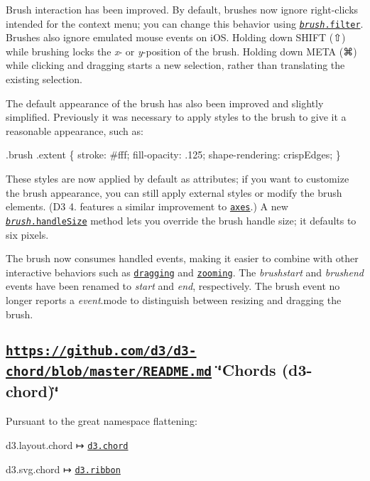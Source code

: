 Brush interaction has been improved. By default, brushes now ignore right-\/clicks intended for the context menu; you can change this behavior using \href{https://github.com/d3/d3-brush/blob/master/README.md#brush_filter}{\tt {\itshape brush}.filter}. Brushes also ignore emulated mouse events on i\+OS. Holding down S\+H\+I\+FT (⇧) while brushing locks the {\itshape x}-\/ or {\itshape y}-\/position of the brush. Holding down M\+E\+TA (⌘) while clicking and dragging starts a new selection, rather than translating the existing selection.

The default appearance of the brush has also been improved and slightly simplified. Previously it was necessary to apply styles to the brush to give it a reasonable appearance, such as\+:


\begin{DoxyCode}
.brush .extent \{
  stroke: #fff;
  fill-opacity: .125;
  shape-rendering: crispEdges;
\}
\end{DoxyCode}


These styles are now applied by default as attributes; if you want to customize the brush appearance, you can still apply external styles or modify the brush elements. (D3 4. features a similar improvement to \href{#axes-d3-axis}{\tt axes}.) A new \href{https://github.com/d3/d3-brush/blob/master/README.md#brush_handleSize}{\tt {\itshape brush}.handle\+Size} method lets you override the brush handle size; it defaults to six pixels.

The brush now consumes handled events, making it easier to combine with other interactive behaviors such as \href{#dragging-d3-drag}{\tt dragging} and \href{#zooming-d3-zoom}{\tt zooming}. The {\itshape brushstart} and {\itshape brushend} events have been renamed to {\itshape start} and {\itshape end}, respectively. The brush event no longer reports a {\itshape event}.mode to distinguish between resizing and dragging the brush.

\subsection*{\href{https://github.com/d3/d3-chord/blob/master/README.md}{\tt https\+://github.\+com/d3/d3-\/chord/blob/master/\+R\+E\+A\+D\+M\+E.\+md} \char`\"{}\+Chords (d3-\/chord)\char`\"{}}

Pursuant to the great namespace flattening\+:


\begin{DoxyItemize}
\item d3.\+layout.\+chord ↦ \href{https://github.com/d3/d3-chord/blob/master/README.md#chord}{\tt d3.\+chord}
\item d3.\+svg.\+chord ↦ \href{https://github.com/d3/d3-chord/blob/master/README.md#ribbon}{\tt d3.\+ribbon}
\end{DoxyItemize}

